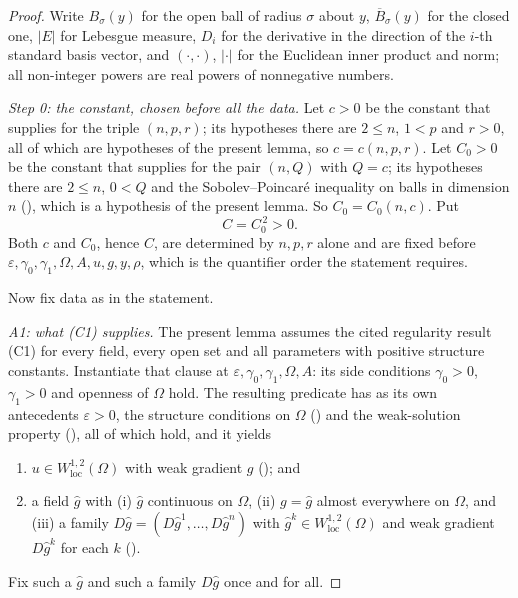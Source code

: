 \begin{proof}
Write $B_\sigma(y)$ for the open ball of radius $\sigma$ about $y$,
$\overline B_\sigma(y)$ for the closed one, $|E|$ for Lebesgue measure, $D_i$
for the derivative in the direction of the $i$-th standard basis vector, and
$(\cdot,\cdot)$, $|\cdot|$ for the Euclidean inner product and norm; all
non-integer powers are real powers of nonnegative numbers.

\emph{Step 0: the constant, chosen before all the data.}  Let $c>0$ be the
constant that  supplies for the triple
$(n,p,r)$; its hypotheses there are $2\le n$, $1<p$ and $r>0$, all of which are
hypotheses of the present lemma, so $c=c(n,p,r)$.  Let $C_0>0$ be the constant
that  supplies for the pair $(n,Q)$ with $Q=c$;
its hypotheses there are $2\le n$, $0<Q$ and the Sobolev--Poincar\'e inequality
on balls in dimension $n$ (), which is a
hypothesis of the present lemma.  So $C_0=C_0(n,c)$.  Put
\[
C=C_0^{\,2}>0 .
\]
Both $c$ and $C_0$, hence $C$, are determined by $n,p,r$ alone and are fixed
before $\varepsilon,\gamma_0,\gamma_1,\Omega,A,u,g,y,\rho$, which is the
quantifier order the statement requires.

Now fix data as in the statement.

\emph{A1: what (C1) supplies.}  The present lemma assumes the cited regularity
result (C1) for every field, every open set and all parameters with positive
structure constants.  Instantiate that clause at
$\varepsilon,\gamma_0,\gamma_1,\Omega,A$: its side conditions $\gamma_0>0$,
$\gamma_1>0$ and openness of $\Omega$ hold.  The resulting predicate
 has as its own antecedents $\varepsilon>0$, the
structure conditions on $\Omega$ () and the
weak-solution property (), all of which hold, and it
yields
\begin{enumerate}
\item $u\in W^{1,2}_{\mathrm{loc}}(\Omega)$ with weak gradient $g$
  (); and
\item a field $\hat g$ with (i) $\hat g$ continuous on $\Omega$, (ii)
  $g=\hat g$ almost everywhere on $\Omega$, and (iii) a family
  $D\hat g=(D\hat g^1,\dots,D\hat g^n)$ with
  $\hat g^k\in W^{1,2}_{\mathrm{loc}}(\Omega)$ and weak gradient $D\hat g^k$ for
  each $k$ ().
\end{enumerate}
Fix such a $\hat g$ and such a family $D\hat g$ once and for all.


\end{proof}
